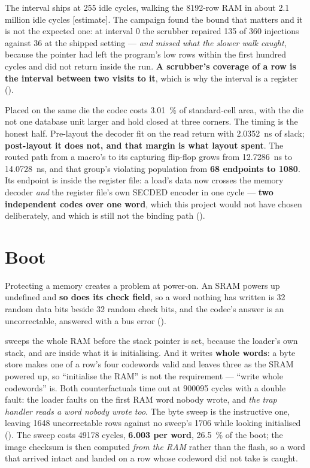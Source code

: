 The interval ships at 255 idle cycles, walking the 8192-row RAM in about
2.1 million idle cycles [estimate]. The campaign found the bound that
matters and it is not the expected one: at interval 0 the scrubber
repaired 135 of 360 injections against 36 at the shipped setting ---
\emph{and missed what the slower walk caught}, because the pointer had
left the program's low rows within the first hundred cycles and did not
return inside the run. \textbf{A scrubber's coverage of a row is the
interval between two visits to it}, which is why the interval is a
register ().

Placed on the same die the codec costs \SI{+3.01}{\percent} of
standard-cell area, with the die not one database unit larger and hold
closed at three corners. The timing is the honest half. Pre-layout the decoder fit on the read return with
\SI{+2.0352}{\nano\second} of slack; \textbf{post-layout it does not,
and that margin is what layout spent}. The routed path from a macro's
 to its capturing flip-flop grows from
\SI{12.7286}{\nano\second} to \SI{14.0728}{\nano\second}, and that
group's violating population from \textbf{68 endpoints to \num{1080}}.
Its endpoint is inside the register file: a load's data now crosses the
memory decoder \emph{and} the register file's own SECDED encoder in one
cycle --- \textbf{two independent codes over one word}, which this
project would not have chosen deliberately, and which is still not the
binding path ().

\section{Boot}
\label{sec:harden-boot}

Protecting a memory creates a problem at power-on. An SRAM powers up
undefined and \textbf{so does its check field}, so a word nothing has
written is 32 random data bits beside 32 random check bits, and the
codec's answer is an uncorrectable, answered with a bus error
().

 sweeps the whole RAM before the stack pointer is
set, because the loader's own stack,  and  are
inside what it is initialising. And it writes \textbf{whole words}: a
byte store makes one of a row's four codewords valid and leaves three as
the SRAM powered up, so ``initialise the RAM'' is not the requirement
--- ``write whole codewords'' is. Both counterfactuals time out at
\num{900095} cycles with a double fault: the loader faults on the first
RAM word nobody wrote, and \emph{the trap handler reads a word nobody
wrote too}. The byte sweep is the instructive one,
leaving \num{1648} uncorrectable rows against no sweep's \num{1706}
while looking initialised (). The sweep costs
\num{49178} cycles, \textbf{6.003 per word}, \SI{26.5}{\percent} of the
boot; the image checksum is then computed \emph{from the RAM} rather
than the flash, so a word that arrived intact and landed on a row whose
codeword did not take is caught.

